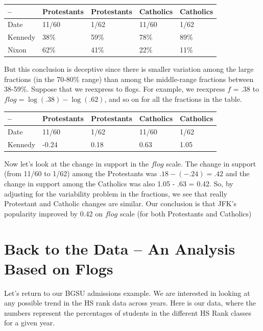\documentclass[
]{book}
\begin{document}
\begin{longtable}[]{@{}lllll@{}}
\toprule
-- & Protestants & Protestants & Catholics & Catholics \\
\midrule
\endhead
Date & 11/60 & 1/62 & 11/60 & 1/62 \\
Kennedy & 38\% & 59\% & 78\% & 89\% \\
Nixon & 62\% & 41\% & 22\% & 11\% \\
\bottomrule
\end{longtable}

But this conclusion is deceptive since there is smaller variation among the large fractions (in the 70-80\% range) than among the middle-range fractions between 38-59\%. Suppose that we reexpress to flogs. For example, we reexpress \(f\) = .38 to \(flog = \log(.38)-\log(.62)\), and so on for all the fractions in the table.

\begin{longtable}[]{@{}lllll@{}}
\toprule
-- & Protestants & Protestants & Catholics & Catholics \\
\midrule
\endhead
Date & 11/60 & 1/62 & 11/60 & 1/62 \\
Kennedy & -0.24 & 0.18 & 0.63 & 1.05 \\
\bottomrule
\end{longtable}

Now let's look at the change in support in the \(flog\) scale. The change in support (from 11/60 to 1/62) among the Protestants was \(.18 - (-.24) = .42\) and the change in support among the Catholics was also 1.05 - .63 = 0.42. So, by adjusting for the variability problem in the fractions, we see that really Protestant and Catholic changes are similar. Our conclusion is that JFK's popularity improved by 0.42 on \(flog\) scale (for both Protestants and Catholics)

\hypertarget{back-to-the-data-an-analysis-based-on-flogs}{%
\section{Back to the Data -- An Analysis Based on Flogs}\label{back-to-the-data-an-analysis-based-on-flogs}}

Let's return to our BGSU admissions example. We are interested in looking at any possible trend in the HS rank data across years. Here is our data, where the numbers represent the percentages of students in the different HS Rank classes for a given year.
\end{document}
